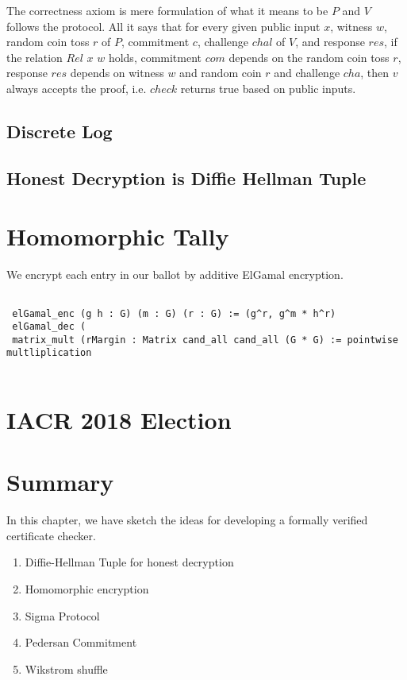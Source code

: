 \noindent
The correctness axiom is mere formulation of what it means to be $P$ and $V$ follows the protocol. 
All it says that for every given public input $x$, witness $w$, random coin toss $r$ of $P$, 
commitment $c$, challenge $chal$ of $V$,  and response $res$, if the relation $Rel$ $x$ $w$ holds,
commitment $com$ depends on the random coin toss $r$,  response $res$ depends on 
witness $w$ and random coin $r$ and challenge $cha$, then $v$ always accepts the proof, i.e. 
$check$ returns true based on public inputs. 



\subsection{Discrete Log}
\subsection{Honest Decryption is Diffie Hellman Tuple}

\section{Homomorphic Tally}
We encrypt each entry in our ballot by additive ElGamal encryption. 

\begin{verbatim}
  
 elGamal_enc (g h : G) (m : G) (r : G) := (g^r, g^m * h^r)
 elGamal_dec (
 matrix_mult (rMargin : Matrix cand_all cand_all (G * G) := pointwise multliplication
 
\end{verbatim}



\section{IACR 2018 Election}



\section{Summary}
In this chapter, we have sketch the ideas for developing a formally verified certificate checker. 

\begin{enumerate}
\item Diffie-Hellman Tuple for honest decryption
\item Homomorphic encryption
\item Sigma Protocol
\item Pedersan Commitment 
\item Wikstrom shuffle 
\end{enumerate}





